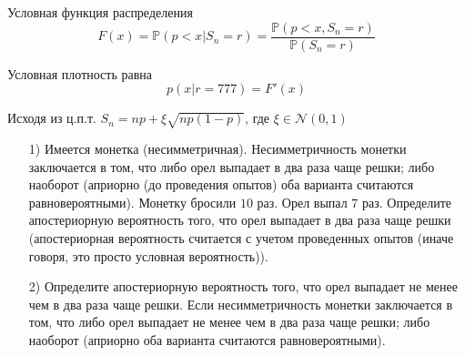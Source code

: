 \begin{ordre}

Условная функция распределения 
$$
F(x)={\mathbb P}(p<x|S_n=r)=\frac{{\mathbb P}(p<x, S_n=r)}{{\mathbb P}(S_n=r)}
$$

Условная плотность равна 
$$
p(x|r=777)=F'(x) 
$$

Исходя из ц.п.т.  $S_n=np+\xi\sqrt{np(1-p)}$, где $\xi\in {\mathcal N}(0,1)$

\end{ordre}


\begin{problem}
\begin{enumerate}
\item[1)] Имеется монетка (несимметричная). Несимметричность монетки заключается в том, что либо орел выпадает в два раза чаще решки; 
либо наоборот (априорно (до проведения опытов) оба варианта считаются равновероятными). Монетку бросили $10$ раз. Орел выпал $7$ раз. 
Определите апостериорную вероятность того, что орел выпадает в два раза чаще решки (апостериорная вероятность считается с учетом 
проведенных опытов (иначе говоря, это просто условная вероятность)). 

\item[2)] Определите апостериорную вероятность того, что орел выпадает не менее чем в два раза чаще решки. Если несимметричность 
монетки заключается в том, что либо орел выпадает не менее чем в два раза чаще решки; либо наоборот (априорно оба варианта считаются 
равновероятными). 
\end{enumerate}
\end{problem}
